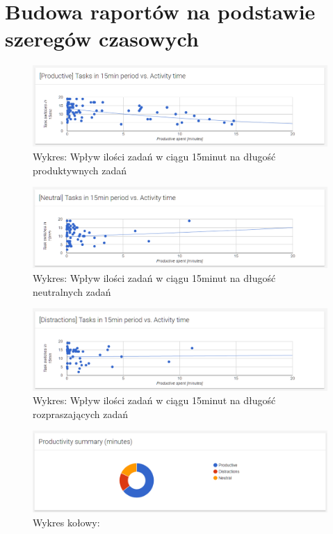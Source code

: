 \documentclass[brudnopis]{xmgr}
\begin{document}
    \section{Budowa raportów na podstawie szeregów czasowych}

    \begin{figure}
        \includegraphics[width=\linewidth]{fig/ui/chart-tasks-productive.png}
        \caption{Wykres: Wpływ ilości zadań w ciągu 15minut na długość produktywnych zadań}
        \label{fig:ui:chart-tasks-productive}
    \end{figure}

    \begin{figure}
        \includegraphics[width=\linewidth]{fig/ui/chart-tasks-neutral.png}
        \caption{Wykres: Wpływ ilości zadań w ciągu 15minut na długość neutralnych zadań}
        \label{fig:ui:chart-tasks-neutral}
    \end{figure}

    \begin{figure}
        \includegraphics[width=\linewidth]{fig/ui/chart-tasks-distractions.png}
        \caption{Wykres: Wpływ ilości zadań w ciągu 15minut na długość rozpraszających zadań}
        \label{fig:ui:chart-tasks-distractions}
    \end{figure}

    \begin{figure}
        \includegraphics[width=\linewidth]{fig/ui/chart-productivity-summary.png}
        \caption{Wykres kołowy: }
        \label{fig:ui:chart-productivity-summary}
    \end{figure}
\end{document}
